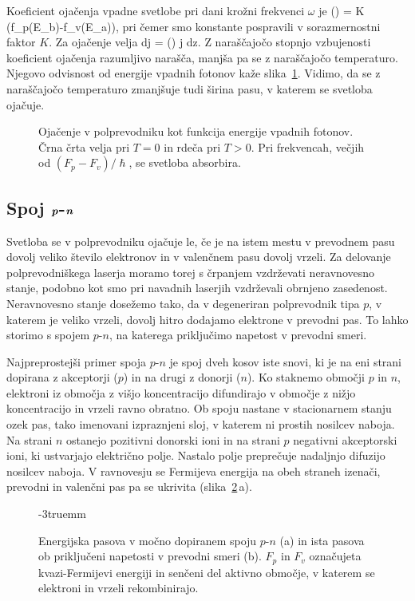 Koeficient ojačenja vpadne svetlobe pri dani krožni
frekvenci $\omega$ je
\beq
\gamma(\omega) = K \left(f_p(E_b)-f_v(E_a)\right)\!,
\label{eq:gainSC}
\eeq
pri čemer smo konstante pospravili v sorazmernostni faktor $K$. Za ojačenje velja
\beq
dj = \gamma(\omega) j dz.
\eeq
Z naraščajočo stopnjo vzbujenosti 
koeficient ojačenja razumljivo narašča, manjša pa se z naraščajočo 
temperaturo. Njegovo odvisnost od energije vpadnih fotonov kaže slika~\ref{s6.11}. Vidimo,
da se z naraščajočo temperaturo zmanjšuje tudi širina pasu, v katerem se svetloba ojačuje.
\begin{figure}[ht]
\centering
\def\svgwidth{80truemm} 

\caption{Ojačenje v polprevodniku kot funkcija energije vpadnih fotonov. Črna črta
velja pri $T=0$ in rdeča pri $T>0$. Pri frekvencah, večjih od $(F_p-F_v)/\hslash$,
se svetloba absorbira. 
}
\label{s6.11}
\end{figure}

\subsection*{Spoj $\textbf{\textit{p}}$-$\textbf{\textit{n}}$}
Svetloba se v polprevodniku ojačuje le, če je na istem mestu v prevodnem pasu
dovolj veliko število elektronov in v valenčnem pasu dovolj vrzeli. Za delovanje
polprevodniškega laserja moramo torej s črpanjem vzdrževati neravnovesno stanje, 
podobno kot smo pri navadnih laserjih vzdrževali obrnjeno zasedenost. 
Neravnovesno stanje dosežemo tako, da v degeneriran pol\-pre\-vod\-nik tipa $p$, v
katerem je veliko vrzeli, dovolj hitro dodajamo elektrone v prevodni pas. To lahko storimo s spojem
$p$-$n$, na katerega priključimo napetost v prevodni smeri. 

Najpreprostejši primer spoja $p$-$n$ je spoj dveh kosov iste snovi, ki je
na eni strani dopirana z akceptorji ($p$) in na drugi z donorji ($n$). 
Ko staknemo območji $p$ in $n$, elektroni iz območja z višjo koncentracijo 
difundirajo v območje z nižjo koncentracijo in vrzeli ravno obratno. 
Ob spoju nastane v stacionarnem stanju ozek pas, tako imenovani izpraznjeni sloj, 
v katerem ni prostih nosilcev naboja. Na strani $n$ ostanejo pozitivni donorski ioni in 
na strani $p$ negativni akceptorski ioni, ki ustvarjajo električno polje. 
Nastalo polje preprečuje nadaljnjo difuzijo nosilcev naboja. 
V ravnovesju se Fermijeva energija na obeh straneh izenači, 
prevodni in valenčni pas pa se ukrivita (slika~\ref{fig:pnlaser}\,a).
\begin{figure}[ht]
\centering
\def\svgwidth{140truemm} 

\caption{Energijska pasova v močno dopiranem spoju $p$-$n$ (a) in 
ista pasova ob priključeni napetosti v prevodni smeri (b). $F_p$ in $F_v$
označujeta kvazi-Fermijevi energiji in senčeni del aktivno območje, 
v katerem se elektroni in vrzeli rekombinirajo.
}
\label{fig:pnlaser}
\vglue-3truemm
\end{figure}

